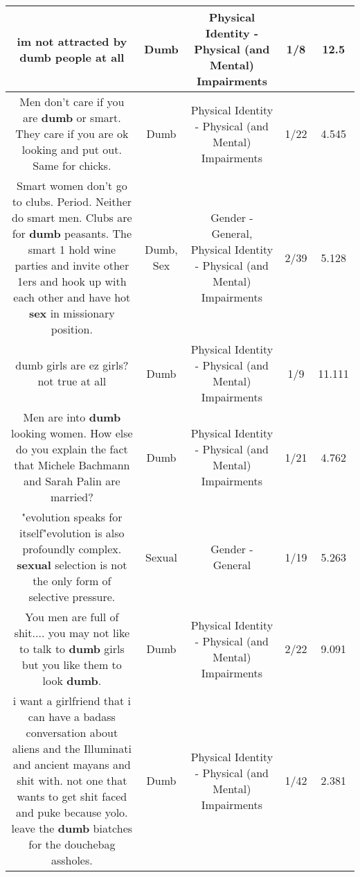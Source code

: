 \documentclass[11pt]{article}
\newlength\mylength
\begin{document}
\begin{center}
\begin{longtable}{|C{.65\mylength}|C{.30\mylength}|C{.12\mylength}|C{.12\mylength}|C{.12\mylength}|}
  \small im not attracted by \textbf{dumb} people at all\normalsize   & Dumb & Physical Identity - Physical (and Mental) Impairments & 1/8 & 12.5 \\  \hline
  \small Men don't care if you are \textbf{dumb} or smart.  They care if you are ok looking and put out.  Same for chicks.\normalsize   & Dumb & Physical Identity - Physical (and Mental) Impairments & 1/22 & 4.545 \\  \hline
  \small Smart women don't go to clubs. Period. Neither do smart men. Clubs are for \textbf{dumb} peasants. The  smart 1 hold wine parties and invite other 1ers and hook up with each other and have hot \textbf{sex} in missionary position.\normalsize   & Dumb, Sex & Gender - General, Physical Identity - Physical (and Mental) Impairments & 2/39 & 5.128 \\  \hline
  \small dumb girls are ez girls?  not true at all\normalsize   & Dumb & Physical Identity - Physical (and Mental) Impairments & 1/9 & 11.111 \\  \hline
  \small Men are into \textbf{dumb} looking women. How else do you explain the fact that Michele Bachmann and Sarah Palin are married?\normalsize   & Dumb & Physical Identity - Physical (and Mental) Impairments & 1/21 & 4.762 \\  \hline
  \small "evolution speaks for itself"evolution is also profoundly complex. \textbf{sexual} selection is not the only form of selective pressure.\normalsize   & Sexual & Gender - General & 1/19 & 5.263 \\  \hline
  \small You men are full of shit.... you may not like to talk to \textbf{dumb} girls but you like them to look \textbf{dumb}.\normalsize   & Dumb & Physical Identity - Physical (and Mental) Impairments & 2/22 & 9.091 \\  \hline
  \small i want a girlfriend that i can have a badass conversation about aliens and the Illuminati and ancient mayans and shit with. not one that wants to get shit faced and puke because yolo. leave the \textbf{dumb} biatches for the douchebag assholes.\normalsize   & Dumb & Physical Identity - Physical (and Mental) Impairments & 1/42 & 2.381 \\  \hline

\end{longtable}
\end{center}
\end{document}
